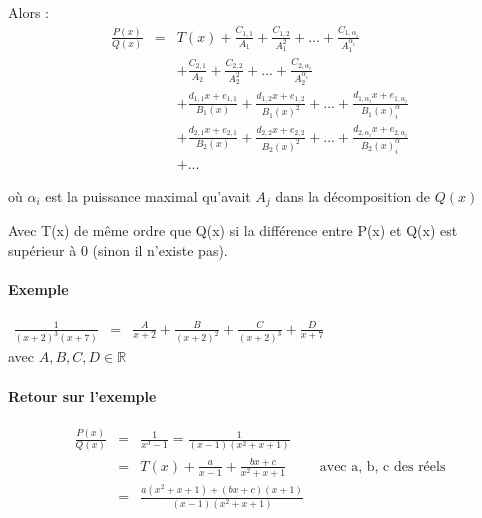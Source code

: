 	Alors : 
	\[\begin{array}{rcl}
			\frac{P(x)}{Q(x)} &=& T(x) + \frac{C_{1,1}}{A_1} + \frac{C_{1,2}}{A_1^2} + ... + \frac{C_{1,\alpha_i}}{A_1^{\alpha_i}} \\
								&& +\frac{C_{2,1}}{A_2} + \frac{C_{2,2}}{A_2^2} + ... + \frac{C_{2,\alpha_i}}{A_2^{\alpha_i}}  \\
								&& + \frac{d_{1,1}x + e_{1,1}}{B_1(x)} +\frac{d_{1,2}x + e_{1,2}}{B_1(x)^2}  + ... + \frac{d_{1,\alpha_i}x + e_{1,\alpha_i}}{B_1(x)^\alpha_i} \\
								&& + \frac{d_{2,1}x + e_{2,1}}{B_2(x)} +\frac{d_{2,2}x + e_{2,2}}{B_2(x)^2}  + ... + \frac{d_{2,\alpha_i}x + e_{2,\alpha_i}}{B_2(x)^\alpha_i} \\
								&& +...
	\end{array}\]

	où $\alpha_i$ est la puissance maximal qu'avait $A_j$ dans la décomposition de $Q(x)$

	Avec T(x) de même ordre que Q(x) si la différence entre P(x) et Q(x) est supérieur à 0 (sinon il n'existe pas).

	\paragraph{Exemple}
	
	$\begin{array}{rcl}
		\frac{1}{(x+2)^3 (x+7)} &=& \frac{A}{x+2} + \frac{B}{(x+2)^2} + \frac{C}{(x+2)^3} + \frac{D}{x+7}
	\end{array}$ ~\\
	avec $A, B, C, D \in \mathbb{R}$

	\paragraph{Retour sur l'exemple}

	\[\begin{array}{rclr}
			\frac{P(x)}{Q(x)} &=& \frac{1}{x^3 -1} = \frac{1}{(x-1)(x^2 + x + 1)} \\
						   &=& T(x) + \frac{a}{x-1} + \frac{bx+c}{x^2 + x + 1} & \text{ avec a, b, c des réels} \\
						   &=& \frac{a(x^2 + x + 1) + (bx+c)(x+1)}{(x-1)(x^2 + x + 1)} \end{array}\]

